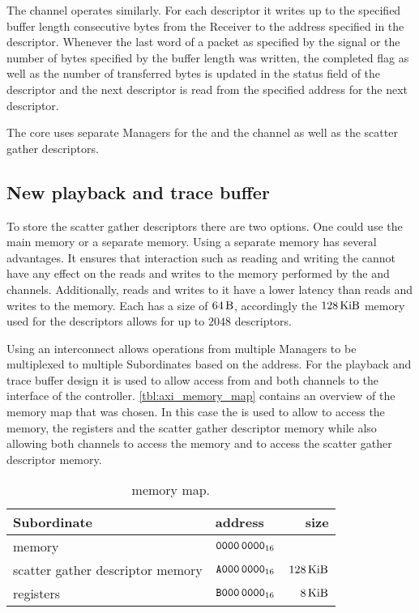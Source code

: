 The \SToMM{} channel operates similarly. For each descriptor it writes up to the specified buffer length consecutive bytes from the \SToMM{} \AXIStream{} Receiver to the address specified in the descriptor.
Whenever the last word of a packet as specified by the \TLAST{} signal or the number of bytes specified by the buffer length was written, the completed flag as well as the number of transferred bytes is updated in the status field of the descriptor and the next descriptor is read from the specified address for the next descriptor.

The \AXIDMA{} core uses separate \AXI{} Managers for the \SToMM{} and the \MMToS{} channel as well as the scatter gather descriptors.

\subsection{New playback and trace buffer}\label{sec:new_buffer}
To store the scatter gather descriptors there are two options. One could use the main \DDR{} memory or a separate memory. Using a separate memory has several advantages. It ensures that interaction such as reading and writing the \descriptor{} cannot have any effect on the reads and writes to the \DDR{} memory performed by the \SToMM{} and \MMToS{} channels. Additionally, reads and writes to it have a lower latency than reads and writes to the \DDR{} memory.
Each \descriptor{} has a size of $\SI{64}{\byte}$, accordingly the $\SI{128}{\kibi\byte}$ memory used for the descriptors allows for up to $\num{2048}$ descriptors.

Using an \AXI{} interconnect allows operations from multiple \AXI{} Managers to be multiplexed to multiple \AXI{} Subordinates based on the address.
For the playback and trace buffer design it is used to allow access from \FAXI{} and both \AXIDMA{} channels to the \AXI{} interface of the \DDR{} controller.
\autoref{tbl:axi_memory_map} contains an overview of the memory map that was chosen. In this case the \Xilinx{} \smartconnect{}\autocite{ref:smartconnect} is used to allow \FAXI{} to access the \DDR{} memory, the \AXIDMA{} registers and the scatter gather descriptor memory while also allowing both \AXIDMA{} channels to access the \DDR{} memory and \AXIDMA{} to access the scatter gather descriptor memory.

\begin{table}
\begin{center}
\begin{tabular}{llr}
\toprule
  \AXI{} Subordinate & address & size \\
  \midrule
  \DDR{} memory & $\texttt{0000\,0000}_{16}$ & \DDRSIZE{} \\
  scatter gather descriptor memory & $\texttt{A000\,0000}_{16}$ & $\SI{128}{\kibi\byte}$ \\
  \AXIDMA{} registers & $\texttt{B000\,0000}_{16}$ & $\SI{8}{\kibi\byte}$ \\
  \bottomrule
\end{tabular}
\end{center}
\caption{\AXI{} memory map.}\label{tbl:axi_memory_map}
\end{table}


